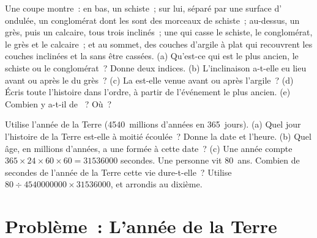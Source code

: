 \begin{exercise}[$\star\star\star$]\label{exo:g7:geological-time:11}
Une coupe montre~: en bas, un schiste~; sur lui, séparé par une surface
d' ondulée, un conglomérat dont les  sont des morceaux de
schiste~; au-dessus, un grès, puis un calcaire, tous trois inclinés~; une
 qui casse le schiste, le conglomérat, le grès et le calcaire~; et
au sommet, des couches d'argile à plat qui recouvrent les couches
inclinées et la  sans être cassées. (a) Qu'est-ce qui est le plus
ancien, le schiste ou le conglomérat~? Donne deux indices. (b)
L'inclinaison a-t-elle eu lieu avant ou après le  du grès~? (c) La
 est-elle venue avant ou après l'argile~? (d) Écris toute l'histoire
dans l'ordre, à partir de l'événement le plus ancien. (e) Combien y a-t-il
de ~? Où~?
\end{exercise}

\begin{exercise}[$\star\star\star$]\label{exo:g7:geological-time:12}
Utilise l'année de la Terre (\num{4540}~millions d'années en 365~jours).
(a) Quel jour l'histoire de la Terre est-elle à moitié écoulée~? Donne la
date et l'heure. (b) Quel âge, en millions d'années, a une  formée à
cette date~? (c) Une année compte $365 \times 24 \times 60 \times 60 = \num{31536000}$
secondes. Une personne vit 80~ans. Combien de secondes de l'année de la
Terre cette vie dure-t-elle~? Utilise $80 \div \num{4540000000} \times
\num{31536000}$, et arrondis au dixième.
\end{exercise}

\section{Problème~: L'année de la Terre}

